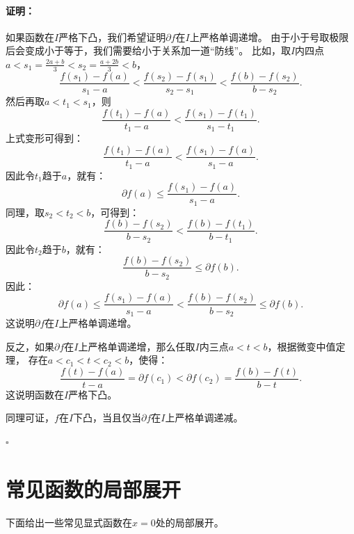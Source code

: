 \documentclass[12pt,UTF8]{ctexbook}
\renewenvironment{proof}{\paragraph{\textbf{证明：}}}{\hfill$\square$}
\begin{document}
\begin{appendix}
\begin{proof}
    如果函数在$I$严格下凸，我们希望证明$\partial f$在$I$上严格单调递增。
    由于小于号取极限后会变成小于等于，我们需要给小于关系加一道“防线”。
    比如，取$I$内四点$a < s_1 = \frac{2a + b}{3} < s_2 = \frac{a + 2b}{3} < b$，
    $$ \frac{f(s_1) - f(a)}{s_1 - a} < \frac{f(s_2) - f(s_1)}{s_2 - s_1} < \frac{f(b) - f(s_2)}{b - s_2}. $$
    然后再取$a < t_1 < s_1$，则
    $$ \frac{f(t_1) - f(a)}{t_1 - a} < \frac{f(s_1) - f(t_1)}{s_1 - t_1}. $$
    上式变形可得到：
    $$ \frac{f(t_1) - f(a)}{t_1 - a} < \frac{f(s_1) - f(a)}{s_1 - a}. $$
    因此令$t_1$趋于$a$，就有：
    $$ \partial f(a) \leqslant \frac{f(s_1) - f(a)}{s_1 - a}.$$
    同理，取$s_2 < t_2 < b$，可得到：
    $$ \frac{f(b) - f(s_2)}{b - s_2} < \frac{f(b) - f(t_1)}{b - t_1}. $$
    因此令$t_2$趋于$b$，就有：
    $$ \frac{f(b) - f(s_2)}{b - s_2} \leqslant \partial f(b).$$
    因此：
    $$ \partial f(a) \leqslant \frac{f(s_1) - f(a)}{s_1 - a} < \frac{f(b) - f(s_2)}{b - s_2} \leqslant \partial f(b).$$
    这说明$\partial f$在$I$上严格单调递增。
    
    反之，如果$\partial f$在$I$上严格单调递增，那么任取$I$内三点$a < t < b$，根据微变中值定理，
    存在$a < c_1 < t < c_2 < b$，使得：
    $$ \frac{f(t) - f(a)}{t - a} = \partial f(c_1) < \partial f(c_2) = \frac{f(b) - f(t)}{b - t}. $$
    这说明函数在$I$严格下凸。

    同理可证，$f$在$I$下凸，当且仅当$\partial f$在$I$上严格单调递减。

\end{proof}

\section{常见函数的局部展开}

下面给出一些常见显式函数在$x = 0$处的局部展开。


\end{appendix}
\end{document}

